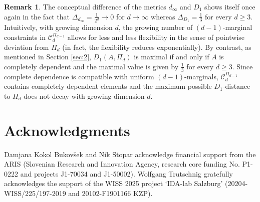 \documentclass[12pt,a4paper]{amsart}
\theoremstyle{definition}
\newtheorem{remark}[theorem]{Remark}
\newcommand{\kc}{\mathcal{C}}
\begin{document}
\begin{remark}
The conceptual difference of the metrics $d_\infty$ and $D_1$ shows itself
once again in the fact that 
$\Delta_{d_\infty}=\frac{1}{2^d} \rightarrow 0$ for $d \rightarrow \infty$ 
whereas $\Delta_{D_1}=\frac{1}{3}$ for every $d \geq 3$. Intuitively, 
with growing dimension $d$, the growing number of $(d-1)$-marginal constraints 
in $\kc_d^{\Pi_{d-1}}$ allows for less and less flexibility in the sense of pointwise deviation
from $\Pi_d$ (in fact, the flexibility reduces exponentially). 
By contrast, as mentioned in Section \ref{sec:2}, $D_1(A,\Pi_d)$ is maximal if and only if $A$ is completely dependent and the maximal value is given by 
$\frac{1}{3}$ for every $d \geq 3$. 
Since complete dependence is compatible with uniform $(d-1)$-marginals, 
$\kc_d^{\Pi_{d-1}}$ contains completely dependent elements and
the maximum possible $D_1$-distance to 
$\Pi_d$ does not decay with growing dimension $d$. 
\end{remark}


\section*{Acknowledgments}

Damjana Kokol Bukovšek and Nik Stopar acknowledge financial support from the ARIS (Slovenian Research and Innovation Agency, research core funding No. P1-0222 and projects J1-70034 and J1-50002). Wolfgang Trutschnig gratefully acknowledges the support 
of the WISS 2025 project ‘IDA-lab Salzburg’ (20204-WISS/225/197-2019 and 20102-F1901166 KZP).






\end{document}
